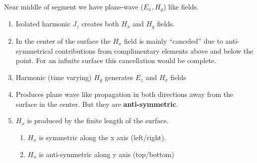 \documentclass{article}
\newcommand{\0}{\varnothing}
\begin{document}
\begin{minipage}{0.45\textwidth}
Near middle of segment we have plane-wave ($E_x, H_y$) like fields. 
\begin{enumerate}
    \item Isolated harmonic $J_z$ creates both $H_x$ and $H_y$ fields.
    \item In the center of the surface the $H_x$ field is mainly ``canceled'' due to anti-symmetrical contributions from complimentary elements above and below the point. For an infinite surface this cancellation would be complete.
    \item Harmonic (time varying) $H_y$ generates $E_z$ and $H_x$ fields
    \item Produces plane wave like propagation in both directions away from the surface in the center. But they are {\bf anti-symmetric}.
    \item $H_x$ is produced by the finite length of the surface.
    \begin{enumerate}
        \item $H_x$ is symmetric along the x axis (left/right).
        \item $H_x$ is anti-symmetric along y axis (top/bottom)
    \end{enumerate}
\end{enumerate}
\end{minipage}
\end{document}
